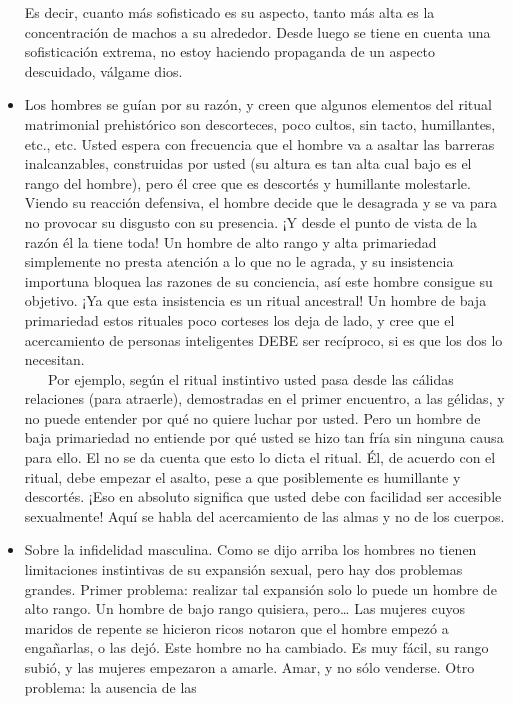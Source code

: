 \begin{itemize}
  Es decir, cuanto más sofisticado es su aspecto, tanto más alta es la
  concentración de machos a su alrededor. Desde luego se tiene en cuenta
  una sofisticación extrema, no estoy haciendo propaganda de un aspecto
  descuidado, válgame dios.
\item
  Los hombres se guían por su razón, y creen que algunos elementos del
  ritual matrimonial prehistórico son descorteces, poco cultos, sin
  tacto, humillantes, etc., etc. Usted espera con frecuencia que el
  hombre va a asaltar las barreras inalcanzables, construidas por usted
  (su altura es tan alta cual bajo es el rango del hombre), pero él cree
  que es descortés y humillante molestarle. Viendo su reacción
  defensiva, el hombre decide que le desagrada y se va para no provocar
  su disgusto con su presencia. ¡Y desde el punto de vista de la razón
  él la tiene toda! Un hombre de alto rango y alta primariedad
  simplemente no presta atención a lo que no le agrada, y su insistencia
  importuna bloquea las razones de su conciencia, así este hombre
  consigue su objetivo. ¡Ya que esta insistencia es un ritual ancestral!
  Un hombre de baja primariedad estos rituales poco corteses los deja de
  lado, y cree que el acercamiento de personas inteligentes DEBE ser
  recíproco, si es que los dos lo necesitan.\\
  \hspace*{0.333em} ~ ~ Por ejemplo, según el ritual instintivo usted
  pasa desde las cálidas relaciones (para atraerle), demostradas en el
  primer encuentro, a las gélidas, y no puede entender por qué no quiere
  luchar por usted. Pero un hombre de baja primariedad no entiende por
  qué usted se hizo tan fría sin ninguna causa para ello. El no se da
  cuenta que esto lo dicta el ritual. Él, de acuerdo con el ritual, debe
  empezar el asalto, pese a que posiblemente es humillante y descortés.
  ¡Eso en absoluto significa que usted debe con facilidad ser accesible
  sexualmente! Aquí se habla del acercamiento de las almas y no de los
  cuerpos.
\item
  Sobre la infidelidad masculina. Como se dijo arriba los hombres no
  tienen limitaciones instintivas de su expansión sexual, pero hay dos
  problemas grandes. Primer problema: realizar tal expansión solo lo
  puede un hombre de alto rango. Un hombre de bajo rango quisiera,
  pero\ldots{} Las mujeres cuyos maridos de repente se hicieron ricos
  notaron que el hombre empezó a engañarlas, o las dejó. Este hombre no
  ha cambiado. Es muy fácil, su rango subió, y las mujeres empezaron a
  amarle. Amar, y no sólo venderse. Otro problema: la ausencia de las

\end{itemize}
